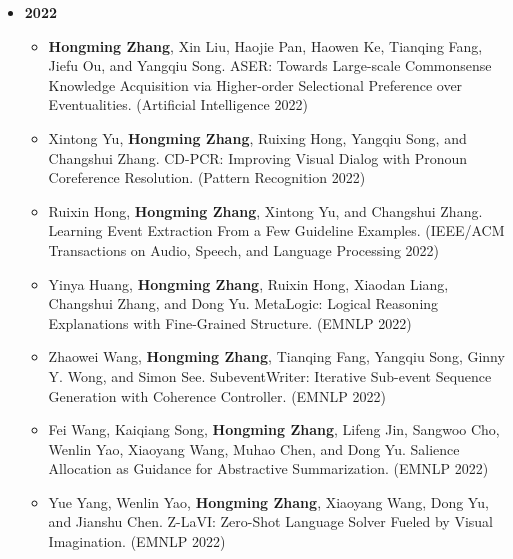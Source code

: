 \begin{itemize}[leftmargin=*, itemsep=0.35em, topsep=0.2em]
\begin{itemize}[leftmargin=1.5em, itemsep=0.2em, topsep=0.1em]
    \item Wenlin Yao, Lifeng Jin, \textbf{Hongming Zhang}, Xiaoman Pan, Kaiqiang Song, Dian Yu, Dong Yu, and Jianshu Chen. How do Words Contribute to Sentence Semantics? Revisiting Sentence Embeddings with a Perturbation Method. (Findings of EACL 2023)
    \item \textbf{Hongming Zhang}, Yintong Huo, Yanai Elazar, Yangqiu Song, Yoav Goldberg, and Dan Roth. CIKQA: Learning Commonsense Inference with a Unified Knowledge-in-the-loop QA Paradigm. (Findings of EACL 2023)
    \item Zizheng Lin, \textbf{Hongming Zhang}, and Yangqiu Song. Global Constraints with Prompting for Zero-Shot Event Argument Classification. (Findings of EACL 2023)
  \end{itemize}

  \item[] \textbf{2022}
  \begin{itemize}[leftmargin=1.5em, itemsep=0.2em, topsep=0.1em]
    \item \textbf{Hongming Zhang}, Xin Liu, Haojie Pan, Haowen Ke, Tianqing Fang, Jiefu Ou, and Yangqiu Song. ASER: Towards Large-scale Commonsense Knowledge Acquisition via Higher-order Selectional Preference over Eventualities. (Artificial Intelligence 2022)
    \item Xintong Yu, \textbf{Hongming Zhang}, Ruixing Hong, Yangqiu Song, and Changshui Zhang. CD-PCR: Improving Visual Dialog with Pronoun Coreference Resolution. (Pattern Recognition 2022)
    \item Ruixin Hong, \textbf{Hongming Zhang}, Xintong Yu, and Changshui Zhang. Learning Event Extraction From a Few Guideline Examples. (IEEE/ACM Transactions on Audio, Speech, and Language Processing 2022)
    \item Yinya Huang, \textbf{Hongming Zhang}, Ruixin Hong, Xiaodan Liang, Changshui Zhang, and Dong Yu. MetaLogic: Logical Reasoning Explanations with Fine-Grained Structure. (EMNLP 2022)
    \item Zhaowei Wang, \textbf{Hongming Zhang}, Tianqing Fang, Yangqiu Song, Ginny Y. Wong, and Simon See. SubeventWriter: Iterative Sub-event Sequence Generation with Coherence Controller. (EMNLP 2022)
    \item Fei Wang, Kaiqiang Song, \textbf{Hongming Zhang}, Lifeng Jin, Sangwoo Cho, Wenlin Yao, Xiaoyang Wang, Muhao Chen, and Dong Yu. Salience Allocation as Guidance for Abstractive Summarization. (EMNLP 2022)
    \item Yue Yang, Wenlin Yao, \textbf{Hongming Zhang}, Xiaoyang Wang, Dong Yu, and Jianshu Chen. Z-LaVI: Zero-Shot Language Solver Fueled by Visual Imagination. (EMNLP 2022)

\end{itemize}
\end{itemize}
